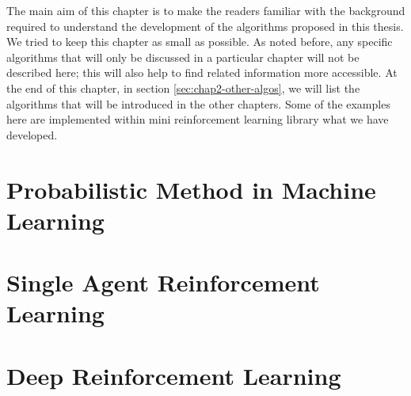 \label{chapter:chap2}
\begin{adjustwidth}{1cm}{}
    The main aim of this chapter is to make the readers familiar with the background required to understand the development of the algorithms proposed in this thesis. We tried to keep this chapter as small as possible. As noted before, any specific algorithms that will only be discussed in a particular chapter will not be described here; this will also help to find related information more accessible. At the end of this chapter, in section \ref{sec:chap2-other-algos}, we will list the algorithms that will be introduced in the other chapters. Some of the examples here are implemented within mini reinforcement learning library what we have developed.
\end{adjustwidth}


\section{Probabilistic Method in Machine Learning}


\section{Single Agent Reinforcement Learning}


\section{Deep Reinforcement Learning}


